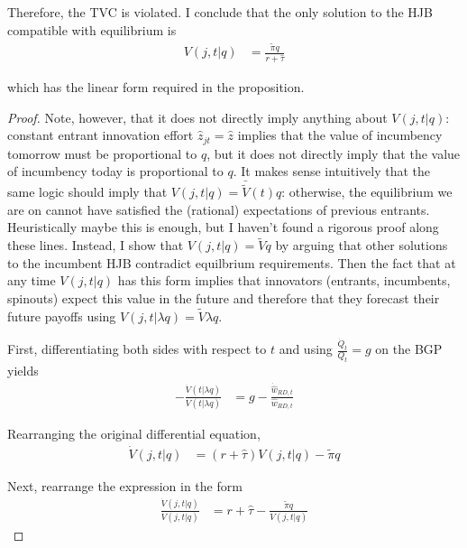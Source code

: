 \documentclass[11pt,english]{article}
\theoremstyle{definition}
\begin{document}
Therefore, the TVC is violated. I conclude that the only solution to the HJB compatible with equilibrium is 
\begin{align}
	V(j,t|q) &= \frac{\tilde{\pi} q}{r + \hat{\tau}}
\end{align}	

which has the linear form required in the proposition.





\begin{proof}
	
	
	Note, however, that it does not directly imply anything about $V(j,t|q)$: constant entrant innovation effort $\hat{z}_{jt} = \hat{z}$ implies that the value of incumbency tomorrow must be proportional to $q$, but it does not directly imply that the value of incumbency today is proportional to $q$. It makes sense intuitively that the same logic should imply that $V(j,t|q) = \bar{\tilde{V}}(t) q$: otherwise, the equilibrium we are on cannot have satisfied the (rational) expectations of previous entrants. Heuristically maybe this is enough, but I haven't found a rigorous proof along these lines. Instead, I show that $V(j,t|q) = \tilde{V}q$ by arguing that other solutions to the incumbent HJB contradict equilbrium requirements. Then the fact that at any time $V(j,t|q)$ has this form implies that innovators (entrants, incumbents, spinouts) expect this value in the future and therefore that they forecast their future payoffs using $V(j,t|\lambda q) = \tilde{V} \lambda q$.
	
	First, differentiating both sides with respect to $t$ and using $\frac{\dot{Q}_t}{Q_t} = g$ on the BGP yields
	\begin{align}
		- \frac{\dot{V}(t|\lambda q)}{V(t|\lambda q)} &= g - \frac{\dot{\hat{w}}_{RD,t}}{\hat{w}_{RD,t}} \label{appendix:eq:freeEntryDifferentiated}
	\end{align}
	
	Rearranging the original differential equation,
	\begin{align}
		\dot{V}(j,t|q) &= (r + \hat{\tau}) V(j,t|q) - \tilde{\pi} q \label{appendix:eq:hjbGeneral}
	\end{align}	
	
	
	
	
	
	Next, rearrange the expression in the form
	\begin{align}
		\frac{\dot{V}(j,t|q)}{V(j,t|q)} &= r + \hat{\tau} - \frac{\tilde{\pi}q}{V(j,t|q)}
	\end{align}
	

\end{proof}
\end{document}
